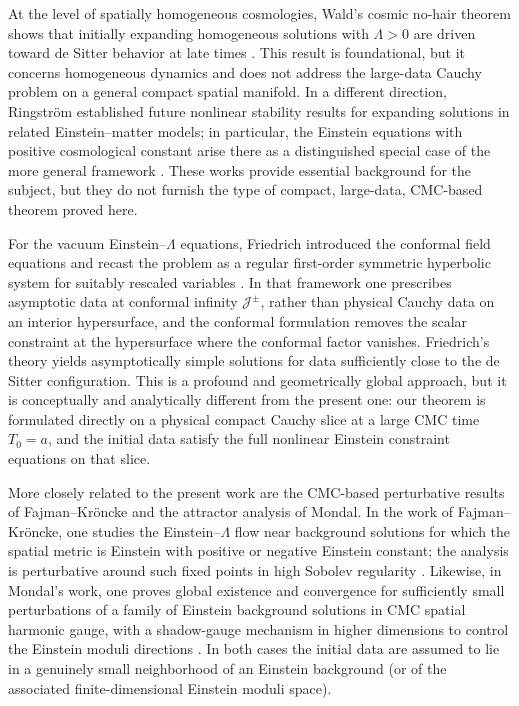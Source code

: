\documentclass{amsart}
\begin{document}
\noindent At the level of spatially homogeneous cosmologies, Wald's cosmic no-hair theorem shows that initially expanding homogeneous solutions with \(\Lambda>0\) are driven toward de Sitter behavior at late times \cite{wald}.  This result is foundational, but it concerns homogeneous dynamics and does not address the large-data Cauchy problem on a general compact spatial manifold.  In a different direction, Ringström established future nonlinear stability results for expanding solutions in related Einstein--matter models; in particular, the Einstein equations with positive cosmological constant arise there as a distinguished special case of the more general framework \cite{ringstrom2008future}.  These works provide essential background for the subject, but they do not furnish the type of compact, large-data, CMC-based theorem proved here.

\noindent For the vacuum Einstein--\(\Lambda\) equations, Friedrich introduced the conformal field equations and recast the problem as a regular first-order symmetric hyperbolic system for suitably rescaled variables \cite{friedrich1986existence1,friedrich1986existence}.  In that framework one prescribes asymptotic data at conformal infinity \(\mathscr J^\pm\), rather than physical Cauchy data on an interior hypersurface, and the conformal formulation removes the scalar constraint at the hypersurface where the conformal factor vanishes.  Friedrich's theory yields asymptotically simple solutions for data sufficiently close to the de Sitter configuration.  This is a profound and geometrically global approach, but it is conceptually and analytically different from the present one: our theorem is formulated directly on a physical compact Cauchy slice at a large CMC time \(T_{0}=a\), and the initial data satisfy the full nonlinear Einstein constraint equations on that slice.

\noindent More closely related to the present work are the CMC-based perturbative results of Fajman--Kr\"oncke and the attractor analysis of Mondal.  In the work of Fajman--Kr\"oncke, one studies the Einstein--\(\Lambda\) flow near background solutions for which the spatial metric is Einstein with positive or negative Einstein constant; the analysis is perturbative around such fixed points in high Sobolev regularity \cite{fajman2020stable}.  Likewise, in Mondal's work, one proves global existence and convergence for sufficiently small perturbations of a family of Einstein background solutions in CMC spatial harmonic gauge, with a shadow-gauge mechanism in higher dimensions to control the Einstein moduli directions \cite{mondal2019attractors}.  In both cases the initial data are assumed to lie in a genuinely small neighborhood of an Einstein background (or of the associated finite-dimensional Einstein moduli space).
\end{document}
